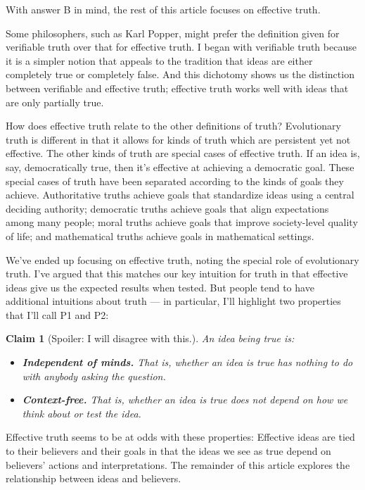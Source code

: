 \documentclass[11pt, oneside]{article}
\newtheorem*{claim}{Claim}
\theoremstyle{argtstyle}
\begin{document}
With answer B in mind, the rest of this article focuses on effective truth.

Some philosophers, such as Karl Popper, might prefer the definition given for
verifiable truth over that for effective truth.
I began with verifiable truth because it is a simpler notion that appeals to the
tradition that ideas are either completely true or completely false.
And this dichotomy shows us the distinction between verifiable and effective
truth; effective truth works well with ideas that are only partially true.

How does effective truth relate to the other definitions of truth?
Evolutionary truth is different in that
it allows for kinds of truth which are persistent yet not effective.
The other kinds of truth are special cases of effective truth.
If an
idea is, say, democratically true, then it's effective at achieving a democratic
goal. These special cases of truth have been separated
according to the kinds of goals they achieve. Authoritative truths achieve goals
that standardize ideas using a central deciding authority; democratic truths
achieve goals that align expectations among many people; moral truths achieve
goals that improve society-level quality of life;
and mathematical truths achieve
goals in mathematical settings.

We've ended up focusing on effective truth, noting the special role of
evolutionary truth. I've argued that this matches our key intuition for truth in
that effective ideas give us the expected results when tested. But people tend
to have additional intuitions about truth --- in
particular, I'll highlight two properties that I'll call
P1 and P2:
\begin{claim}[Spoiler: I will disagree with this.]\label{c7}
    An idea being true is:
\begin{itemize}
    \item{} {\normalfont [{\bf P1.}]}
        {\bf Independent of minds.} That is, whether an idea is true has
        nothing to
        do with anybody asking the question.
    \item{} {\normalfont [{\bf P2.}]}
        {\bf Context-free.} That is, whether an idea is true does not depend
        on
        how we think about or test the idea.
\end{itemize}
\end{claim}
Effective truth seems to be at odds with these properties:
Effective ideas are tied to their believers and their goals in that
the ideas we see as true depend on
believers' actions and interpretations.
The remainder of this
article explores the relationship between ideas and believers.
\end{document}
